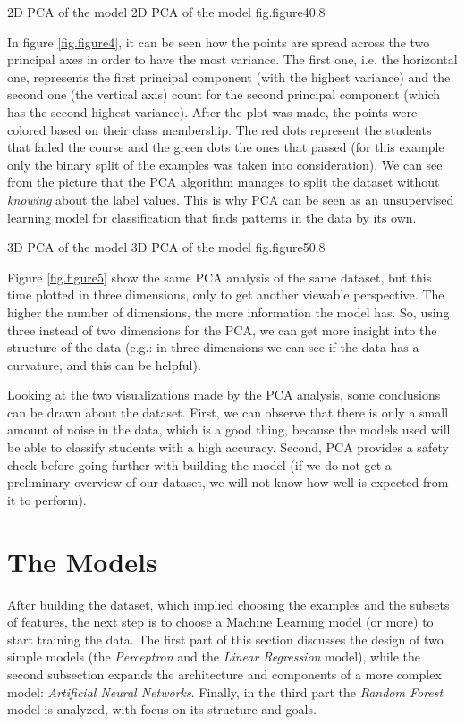 %
    {2D PCA of the model}%
    {2D PCA of the model}%
    {fig.figure4}{0.8}

In figure \ref{fig.figure4}, it can be seen how the points are spread across 
the two principal axes in order to have the most variance. The first one, i.e. 
the horizontal one, represents the first principal component (with the highest 
variance) and the second one (the vertical axis) count for the second principal 
component (which has the second-highest variance). After the plot was made, 
the points were colored based on their class membership. The red dots represent 
the students that failed the course and the green dots the ones that passed 
(for this example only the binary split of the examples was taken into consideration). 
We can see from the picture that the PCA algorithm manages to split the dataset 
without {\it knowing} about the label values. This is why PCA can be seen as 
an unsupervised learning model for classification that finds patterns in the data 
by its own. 

%
    {3D PCA of the model}%
    {3D PCA of the model}%
    {fig.figure5}{0.8}

Figure \ref{fig.figure5} show the same PCA analysis of the same dataset, but 
this time plotted in three dimensions, only to get another viewable perspective.
The higher the number of dimensions, the more information the model has. So, 
using three instead of two dimensions for the PCA, we can get more insight into 
the structure of the data (e.g.: in three dimensions we can see if the data has 
a curvature, and this can be helpful).

Looking at the two visualizations made by the PCA analysis, some conclusions can 
be drawn about the dataset. First, we can observe that there is only a small 
amount of noise in the data, which is a good thing, because the models used will 
be able to classify students with a high accuracy. Second, PCA provides a 
safety check before going further with building the model (if we do not get a 
preliminary overview of our dataset, we will not know how well is expected from 
it to perform).

\section{The Models}
\label{models}

After building the dataset, which implied choosing the examples and the subsets 
of features, the next step is to choose a Machine Learning model (or more) to 
start training the data. The first part of this section discusses the design of 
two simple models (the {\it Perceptron} and the {\it Linear Regression} model), 
while the second subsection expands the architecture and components of a more 
complex model: {\it Artificial Neural Networks}. Finally, in the third part 
the {\it Random Forest} model is analyzed, with focus on its structure and goals. 

